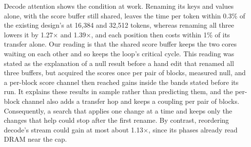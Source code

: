 Decode attention shows the condition at work.
Renaming its keys and values alone, with the score buffer still shared, leaves the time per token within 0.3\% of the existing design's at 16{,}384 and 32{,}512 tokens, whereas renaming all three lowers it by 1.27$\times$ and 1.39$\times$, and each position then costs within 1\% of its transfer alone.
Our reading is that the shared score buffer keeps the two cores waiting on each other and so keeps the loop's critical cycle.
This reading was stated as the explanation of a null result before a hand edit that renamed all three buffers, but acquired the scores once per pair of blocks, measured null, and a per-block score channel then reached gains inside the bands stated before its run.
It explains these results in sample rather than predicting them, and the per-block channel also adds a transfer hop and keeps a coupling per pair of blocks.
Consequently, a search that applies one change at a time and keeps only the changes that help could stop after the first rename.
By contrast, reordering decode's stream could gain at most about 1.13$\times$, since its phases already read DRAM near the cap.

